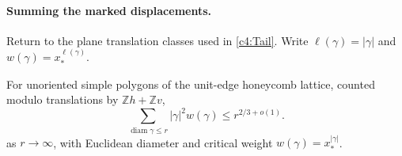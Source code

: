 \paragraph{Summing the marked displacements.}
Return to the plane translation classes used in \eqref{c4:Tail}.  Write
\(\ell(\gamma)=|\gamma|\) and \(w(\gamma)=x_*^{\ell(\gamma)}\).
\begin{proposition}\label{c4:prop-polygon-second-moment}
For unoriented simple polygons of the unit-edge honeycomb lattice,
counted modulo translations by \(\mathbb Z h+\mathbb Z v\),
\begin{equation}
                   \sum_{\operatorname{diam}\gamma\le r}|\gamma|^2 w(\gamma)
                             \le r^{2/3+o(1)}.                         \label{c4:Geom-3}
\end{equation}
as \(r\to\infty\), with Euclidean diameter and critical weight
\(w(\gamma)=x_*^{|\gamma|}\).
\end{proposition}

